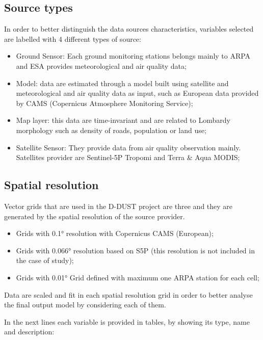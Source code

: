 \subsection{Source types}
In order to better distinguish the data sources characteristics, variables selected are labelled with 4 different types of source:
\begin{itemize}

\item Ground Sensor: Each ground monitoring stations belongs mainly to ARPA and ESA provides meteorological and air quality data;
\item Model: data are estimated through a model built using satellite and meteorological and air quality data as input, such as European data provided by CAMS (Copernicus Atmosphere Monitoring Service);
\item Map layer: this data are time-invariant and are related to Lombardy morphology such as density of roads, population or land use; 
\item Satellite Sensor: They provide data from air quality observation mainly. Satellites provider are Sentinel-5P Tropomi and Terra \& Aqua MODIS;
\end{itemize}
\bigbreak
\subsection{Spatial resolution}
Vector grids that are used in the D-DUST project are three and they are generated by the spatial resolution of the source provider. 

\begin{itemize}
\item Grids with 0.1° resolution with Copernicus CAMS (European);
\item Grids with 0.066° resolution based on S5P (this resolution is not included in the case of study);
\item Grids with 0.01° Grid defined with maximum one ARPA station for each cell;
\end{itemize}

Data are scaled and fit in each spatial resolution grid in order to better analyse the final output model by considering each of them. 
\par
In the next lines each variable is provided in tables, by showing its type, name and description:

